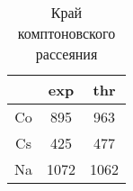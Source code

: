 \begin{table}[h!]
    \centering
    \begin{tabular}{|c|c|c|}
    \hline
       & exp  & thr  \\ \hline
    Co & 895  & 963  \\ \hline
    Cs & 425  & 477  \\ \hline
    Na & 1072 & 1062 \\ \hline
    \end{tabular}
    \caption{Край комптоновского рассеяния}
    \label{tab:kompton}
\end{table}